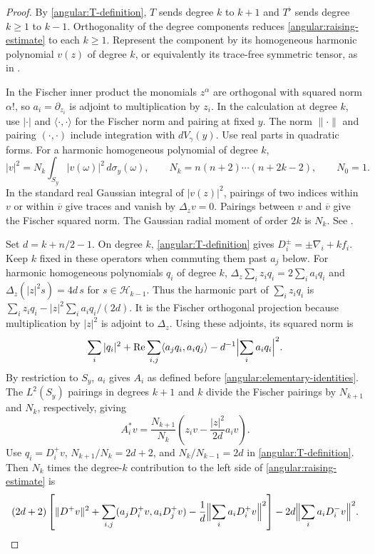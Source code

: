 \documentclass[11pt,a4paper]{article}
\theoremstyle{definition}
\theoremstyle{remark}
\numberwithin{equation}{section}
\begin{document}
\begin{proof}
By \eqref{angular:T-definition}, $T$ sends degree $k$ to $k+1$
and $T^\flat$ sends degree $k\ge1$ to $k-1$. Orthogonality of the
degree components reduces \eqref{angular:raising-estimate} to each
$k\ge1$. Represent the component by its homogeneous harmonic
polynomial $v(z)$ of degree $k$, or equivalently its trace-free
symmetric tensor, as in \cite{PSU15,GPSU16}.

In the Fischer inner product the monomials $z^\alpha$ are orthogonal
with squared norm $\alpha!$, so $a_i=\partial_{z_i}$ is adjoint to
multiplication by $z_i$. In the calculation at degree $k$, use
$|\cdot|$ and $\langle\cdot,\cdot\rangle$ for the Fischer norm and
pairing at fixed $y$. The norm $\|\cdot\|$ and pairing $(\cdot,\cdot)$
include integration with $dV_\gamma(y)$. Use real parts in quadratic
forms. For a harmonic homogeneous polynomial of degree $k$,
\[
 |v|^2=N_k\int_{S_y}|v(\omega)|^2\,d\sigma_y(\omega),
 \qquad N_k=n(n+2)\cdots(n+2k-2),\qquad N_0=1.
\]
In the standard real Gaussian integral of $|v(z)|^2$, pairings of two
indices within $v$ or within $\overline v$ give traces and vanish by
$\Delta_z v=0$. Pairings between $v$ and $\overline v$ give the
Fischer squared norm. The Gaussian radial moment of order $2k$ is $N_k$.
See \cite[Equation~(2.1) and Theorem~2.1]{Render08}.

Set $d=k+n/2-1$. On degree $k$, \eqref{angular:T-definition}
gives $D_i^\pm=\pm\nabla_i+k f_i$. Keep $k$ fixed in these operators
when commuting them past $a_j$ below.
For harmonic homogeneous polynomials $q_i$ of degree $k$,
$\Delta_z\sum_i z_iq_i=2\sum_i a_iq_i$ and
$\Delta_z(|z|^2s)=4d\,s$ for $s\in\mathcal H_{k-1}$. Thus the
harmonic part of $\sum_i z_iq_i$ is
$\sum_i z_iq_i-|z|^2\sum_i a_iq_i/(2d)$. It is the Fischer orthogonal
projection because multiplication by $|z|^2$ is adjoint to $\Delta_z$.
Using these adjoints, its squared norm is
\[
 \sum_i|q_i|^2+\operatorname{Re}\sum_{i,j}\langle a_jq_i,a_iq_j\rangle
             -d^{-1}\Bigl|\sum_i a_iq_i\Bigr|^2.
\]
By restriction to $S_y$, $a_i$ gives $A_i$ as defined before
\eqref{angular:elementary-identities}. The $L^2(S_y)$ pairings in
degrees $k+1$ and $k$ divide the Fischer pairings by $N_{k+1}$
and $N_k$, respectively, giving
\[
 A_i^*v=\frac{N_{k+1}}{N_k}
            \left(z_i v-\frac{|z|^2}{2d}a_iv\right).
\]
Use $q_i=D_i^+v$, $N_{k+1}/N_k=2d+2$, and $N_k/N_{k-1}=2d$ in
\eqref{angular:T-definition}. Then $N_k$ times the degree-$k$
contribution to the left side of \eqref{angular:raising-estimate} is
\begin{equation}\label{angular:Fock-difference}
 \begin{split}
 (2d+2)\left[\|D^+v\|^2
   +\sum_{i,j}(a_jD_i^+v,a_iD_j^+v)
   -\frac1d\Bigl\|\sum_i a_iD_i^+v\Bigr\|^2\right]
 -2d\Bigl\|\sum_i a_iD_i^-v\Bigr\|^2.
 \end{split}
\end{equation}


\end{proof}
\end{document}

